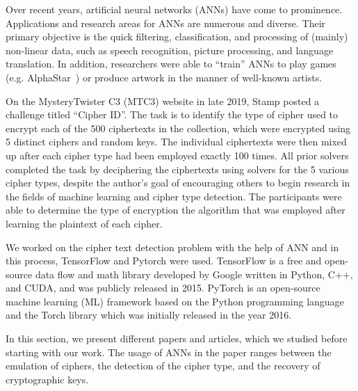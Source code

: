 \documentclass[a4paper]{article}
\begin{document}
Over recent years, artificial neural networks (ANNs) have 
come to prominence. Applications and research areas for ANNs 
are numerous and diverse. Their primary objective is the quick 
filtering, classification, and processing of (mainly) non-linear 
data, such as speech recognition, picture processing, and language 
translation. In addition, researchers were able to “train” ANNs 
to play games (e.g. AlphaStar~\cite{AlphaStar:online}) or produce 
artwork in the manner of well-known artists.

On the MysteryTwister C3\cite{Welcomet7:online} (MTC3) website 
in late 2019, Stamp posted a challenge titled “Cipher ID”. The 
task is to identify the type of cipher used to encrypt each 
of the 500 ciphertexts in the collection, which were encrypted 
using 5 distinct ciphers and random keys. The individual ciphertexts 
were then mixed up after each cipher type had been employed 
exactly 100 times. All prior solvers completed the task by deciphering 
the ciphertexts using solvers for the 5 various cipher types, 
despite the author's goal of encouraging others to begin research 
in the fields of machine learning and cipher type detection. 
The participants were able to determine the type of encryption 
the algorithm that was employed after learning the plaintext of each cipher.

We worked on the cipher text detection problem with the help of ANN 
and in this process, TensorFlow and Pytorch were used. TensorFlow 
is a free and open-source data flow and math library developed 
by Google written in Python, C++, and CUDA, and was publicly
released in 2015. PyTorch is an open-source machine learning (ML) 
framework based on the Python programming language and the Torch 
library which was initially released in the year 2016.

In this section, we present different papers and articles, which 
we studied before starting with our work. The usage of ANNs 
in the paper ranges between the emulation of ciphers, the detection 
of the cipher type, and the recovery of cryptographic keys.
\end{document}
